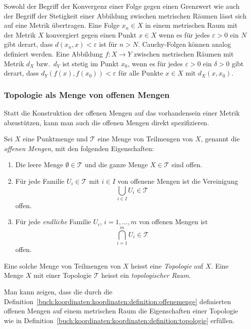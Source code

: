 Sowohl der Begriff der Konvergenz einer Folge gegen einen Grenzwert 
wie auch der Begriff der Stetigkeit einer Abbildung zwischen metrischen
Räumen lässt sich auf eine Metrik übertragen.
Eine Folge $x_n\in X$ in einem metrischen Raum mit der Metrik $X$
konvergiert gegen einen Punkt $x\in X$ wenn es für jedes $\varepsilon>0$
ein $N$ gibt derart, dass $d(x_n,x)<\varepsilon$ ist für $n>N$.
Cauchy-Folgen können analog definiert werden.
Eine Abbildung $f\colon X\to Y$ zwischen metrischen Räumen mit
Metrik $d_X$ bzw.~$d_Y$ ist stetig im Punkt $x_0$, wenn es für jedes
$\varepsilon>0$ ein $\delta > 0$ gibt derart, dass
$d_Y(f(x),f(x_0))<\varepsilon$ für alle Punkte $x\in X$ mit
$d_X(x,x_0)$.

%
%
\subsubsection{Topologie als Menge von offenen Mengen}
Statt die Konstruktion der offenen Mengen auf das vorhandensein einer
Metrik abzustützen, kann man auch die offenen Mengen direkt spezifizieren.

\begin{definition}[Topologie]
\label{buch:koordinaten:koordinaten:definition:topologie}
Sei $X$ eine Punktmenge und $\mathscr{T}$ eine Menge von Teilmengen
von $X$, genannt die {\em offenen Mengen}, mit den folgenden Eigenschaften:
%
\begin{enumerate}
\item Die leere Menge $\emptyset \in \mathscr{T}$ und die ganze Menge
$X\in \mathscr{T}$ sind offen.
\item Für jede Familie $U_i\in \mathscr{T}$ mit $i\in I$ von offenene
Mengen ist die Vereinigung
\[
\bigcup_{i\in I}U_i \in\mathscr{T}
\]
offen.
\item Für jede {\em endliche} Familie $U_i$, $i=1,\dots,m$ von offenen
Mengen ist
\[
\bigcap_{i=1}^m U_i \in\mathscr{T}
\]
offen.
\end{enumerate}
Eine solche Menge von Teilmengen von $X$ heisst eine {\em Topologie}
%
auf $X$.
Eine Menge $X$ mit einer Topologie $\mathscr{T}$ heisst ein
{\em topologischer Raum}.
%
\end{definition}

Man kann zeigen, dass die durch die 
Definition~\ref{buch:koordinaten:koordinaten:definition:offenemenge}
definierten offenen Mengen auf einem metrischen Raum
die Eigenschaften einer Topologie wie in
Definition~\ref{buch:koordinaten:koordinaten:definition:topologie}
erfüllen.

